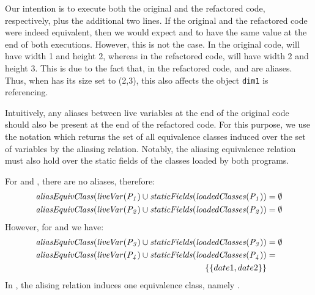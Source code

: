 \documentclass[sigconf,review,anonymous]{acmart}
\begin{document}
\begin{example}
Our intention is to execute both the original and the refactored code, respectively, plus the additional two lines.
If the original and the refactored code were indeed equivalent,
then we would expect  and  to have the same value at the end of both executions. 
However, this is not the case.
In the original code,  will have width 1 and height 2, whereas in the refactored code,
 will have width 2 and height 3. This is due to the fact that,
in the refactored code,  and  are aliases. %
Thus, when  has its size set to (2,3), this also affects the object \texttt{dim1} is referencing.
\end{example}  

Intuitively, any aliases between live variables at the end of the original code should also
be present at the end of the refactored code. For this purpose, we use the notation
 which returns the set of all equivalence classes induced over the
set of variables  by the aliasing relation.  
Notably, the aliasing equivalence relation must also hold over the
static fields of the classes loaded by both programs.


\begin{example}
For  and , there are no aliases, therefore:
\[
\begin{aligned}[t]
  \mathit{{aliasEquivClass(liveVar(P_1) \cup staticFields(loadedClasses(P_1))}} &= \emptyset\\
  \mathit{{aliasEquivClass(liveVar(P_2) \cup staticFields(loadedClasses(P_2))}} &= \emptyset
\end{aligned}
\]
%
However, for  and  we have:
\[
\begin{aligned}[t]
  \mathit{{aliasEquivClass(liveVar(P_3) \cup staticFields(loadedClasses(P_3))}} &= \emptyset\\
  \mathit{{aliasEquivClass(liveVar(P_4) \cup staticFields(loadedClasses(P_4))}} &= \\
  \qquad \{\{date1, date2\}\} &
\end{aligned}
\]
In , the alising relation induces one equivalence class, namely .

\end{example}
  
\end{document}
